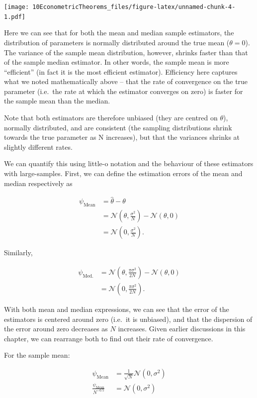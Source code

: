 \documentclass[
]{book}
\begin{document}
\texttt{[image: 10EconometricTheorems\_files/figure-latex/unnamed-chunk-4-1.pdf]}

Here we can see that for both the mean and median sample estimators, the distribution of parameters is normally distributed around the true mean (\(\theta = 0\)). The variance of the sample mean distribution, however, shrinks faster than that of the sample median estimator. In other words, the sample mean is more ``efficient'' (in fact it is the most efficient estimator). Efficiency here captures what we noted mathematically above -- that the rate of convergence on the true parameter (i.e.~the rate at which the estimator converges on zero) is faster for the sample mean than the median.

Note that both estimators are therefore unbiased (they are centred on \(\theta\)), normally distributed, and are consistent (the sampling distributions shrink towards the true parameter as N increases), but that the variances shrinks at slightly different rates.

We can quantify this using little-o notation and the behaviour of these estimators with large-samples. First, we can define the estimation errors of the mean and median respectively as

\[
\begin{aligned}
\psi_\text{Mean} &= \hat{\theta} - \theta \\ 
&= \mathcal{N}(\theta, \frac{\sigma^2}{N}) - \mathcal{N}(\theta,0) \\
&= \mathcal{N}(0,\frac{\sigma^2}{N}).
\end{aligned}
\]

Similarly,

\[
\begin{aligned}
\psi_\text{Med.} &= \mathcal{N}(\theta, \frac{\pi\sigma^2}{2N}) - \mathcal{N}(\theta,0)  \\
& = \mathcal{N}(0, \frac{\pi\sigma^2}{2N}).
\end{aligned}
\]

With both mean and median expressions, we can see that the error of the estimators is centered around zero (i.e.~it is unbiased), and that the dispersion of the error around zero decreases as \(N\) increases. Given earlier discussions in this chapter, we can rearrange both to find out their rate of convergence.

For the sample mean:

\[ 
\begin{aligned}
\psi_\text{Mean} &= \frac{1}{\sqrt{N}}\mathcal{N}(0,\sigma^2) \\
\frac{\psi_\text{Mean}}{N^{-0.5}} &= \mathcal{N}(0,\sigma^2)
\end{aligned}
\]
\end{document}
